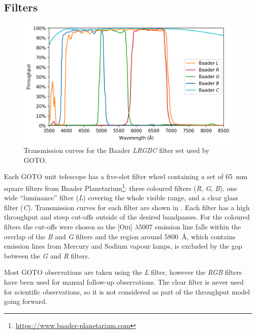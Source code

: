 \begin{colsection}
\begin{colsection}
\end{colsection}

\newpage
\subsection{Filters}
\label{sec:filters}
\begin{colsection}

\begin{figure}[t]
    \begin{center}
        \includegraphics[width=\textwidth]{images/throughput/trans_filters.png}
    \end{center}
    \caption[Baader filter transmission curves]{
        Transmission curves for the Baader \textit{LRGBC} filter set used by GOTO.\
    }\label{fig:filters}
\end{figure}

Each GOTO unit telescope has a five-slot filter wheel containing a set of \SI{65}{\milli\metre} square filters from Baader Planetarium\footnote{\url{https://www.baader-planetarium.com}}: three coloured filters (\textit{R}, \textit{G}, \textit{B}), one wide ``luminance'' filter (\textit{L}) covering the whole visible range, and a clear glass filter ({\textit{C}}). Transmission curves for each filter are shown in . Each filter has a high throughput and steep cut-offs outside of the desired bandpasses. For the coloured filters the cut-offs were chosen so the [O\textsc{iii}] $\lambda 5007$ emission line falls within the overlap of the \textit{B} and \textit{G} filters and the region around \SI{5800}{\angstrom}, which contains emission lines from Mercury and Sodium vapour lamps, is excluded by the gap between the \textit{G} and \textit{R} filters.

Most GOTO observations are taken using the \textit{L} filter, however the \textit{RGB} filters have been used for manual follow-up observations. The clear filter is never used for scientific observations, so it is not considered as part of the throughput model going forward.


\end{colsection}
\end{colsection}
